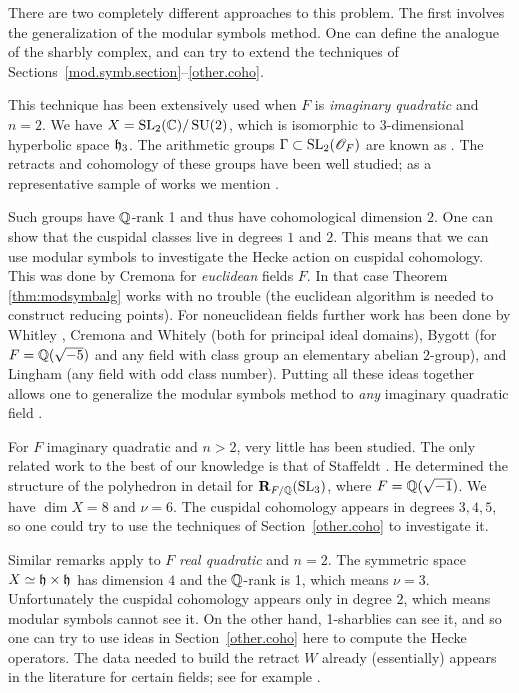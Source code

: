 There are two completely different approaches to this problem.  The
first involves the generalization of the modular symbols method.  One
can define the analogue of the sharbly complex, and can try to extend
the techniques of Sections~\ref{mod.symb.section}--\ref{other.coho}.

This technique has been extensively used when 
$F$ is \emph{imaginary quadratic} and $n=2$.  We have $X = \operatorname{SL}_{2}
(\mathbb{C})/\operatorname{SU} (2)$, which is isomorphic to $3$-dimensional hyperbolic
space $\mathfrak h_{3}$.  The arithmetic groups $\Gamma \subset \operatorname{SL}_{2}
(\mathscr O_{F})$ are known as .  The retracts and
cohomology of these groups have been well studied; as a representative
sample of works we mention \cite{mendoza, egm, vogtmann,
grune.sch}.

Such groups have $\mathbb{Q}$-rank 1 and thus have cohomological dimension
$2$.  One can show that the cuspidal classes live in degrees $1$ and
$2$.  This means that we can use modular symbols to investigate the
Hecke action on cuspidal cohomology.  This was done by Cremona
\cite{crem} for \emph{euclidean} fields $F$.  In that case Theorem
\ref{thm:modsymbalg} works with no trouble (the euclidean algorithm is
needed to construct reducing points).  For noneuclidean fields
further work has been done by Whitley \cite{whit}, Cremona and Whitely
\cite{crem.whit} (both for principal ideal domains), Bygott
\cite{bygott} (for $F=\mathbb{Q} (\sqrt{-5})$ and any field with class group
an elementary abelian $2$-group), and Lingham \cite{lingham} (any
field with odd class number).  Putting all these ideas together allows
one to generalize the modular symbols method to \emph{any} imaginary
quadratic field \cite{crem.letter}.

For $F$ imaginary quadratic and $n>2$, very little has been studied.
The only related work to the best of our knowledge is that of
Staffeldt \cite{staffeldt}.  He determined the structure of the \Vor
polyhedron in detail for $\mathbf{R}_{F/\mathbb{Q}} (\operatorname{SL}_{3})$, where $F = \mathbb{Q}
(\sqrt{-1})$.  We have $\dim X = 8$ and $\nu =6$.  The cuspidal
cohomology appears in degrees $3,4,5$, so one could try to use the
techniques of Section~\ref{other.coho} to investigate it.

Similar remarks apply to $F$ \emph{real quadratic} and $n=2$.  The
symmetric space $X \simeq \mathfrak h \times \mathfrak h$ has dimension $4$ and the
$\mathbb{Q}$-rank is 1, which means $\nu = 3$.  Unfortunately the cuspidal
cohomology appears only in degree $2$, which means modular symbols
cannot see it.  On the other hand, 1-sharblies can see it, and so one
can try to use ideas in Section~\ref{other.coho} here to compute the Hecke
operators.  The data needed to build the retract $W$ already
(essentially) appears in the literature for certain fields; see for
example \cite{ong}.

